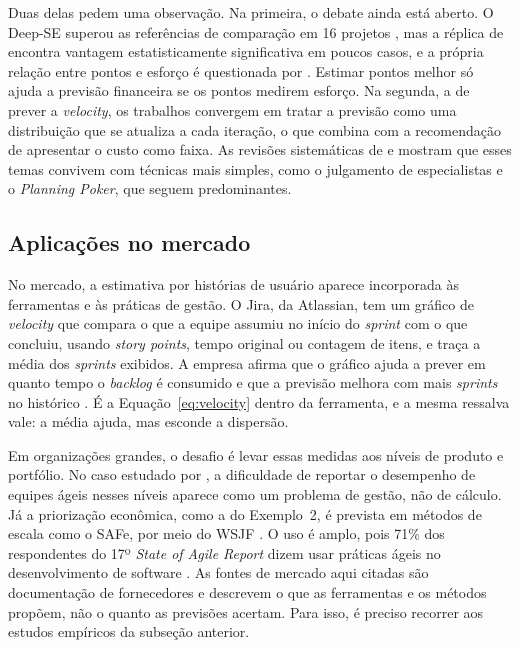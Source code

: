 Duas delas pedem uma observação. Na primeira, o debate ainda está aberto. O
Deep-SE superou as referências de comparação em 16 projetos
\cite{choetkiertikul2019}, mas a réplica de  encontra
vantagem estatisticamente significativa em poucos casos, e a própria relação
entre pontos e esforço é questionada por . Estimar pontos
melhor só ajuda a previsão financeira se os pontos medirem esforço. Na segunda,
a de prever a \textit{velocity}, os trabalhos convergem em tratar a previsão
como uma distribuição que se atualiza a cada iteração, o que combina com a
recomendação de apresentar o custo como faixa. As revisões sistemáticas de
 e  mostram que esses temas
convivem com técnicas mais simples, como o julgamento de especialistas e o
\textit{Planning Poker}, que seguem predominantes.

\subsection{Aplicações no mercado}
\label{sub:aplic-mercado}

No mercado, a estimativa por histórias de usuário aparece incorporada às
ferramentas e às práticas de gestão. O Jira, da Atlassian, tem um gráfico de
\textit{velocity} que compara o que a equipe assumiu no início do
\textit{sprint} com o que concluiu, usando \textit{story points}, tempo original
ou contagem de itens, e traça a média dos \textit{sprints} exibidos. A empresa
afirma que o gráfico ajuda a prever em quanto tempo o \textit{backlog} é
consumido e que a previsão melhora com mais \textit{sprints} no histórico
\cite{atlassianvelocity}. É a Equação~\ref{eq:velocity} dentro da ferramenta, e a
mesma ressalva vale: a média ajuda, mas esconde a dispersão.

Em organizações grandes, o desafio é levar essas medidas aos níveis de produto e
portfólio. No caso estudado por , a dificuldade de
reportar o desempenho de equipes ágeis nesses níveis aparece como um problema de
gestão, não de cálculo. Já a priorização econômica, como a do
Exemplo~2, é prevista em métodos de escala como o SAFe, por meio do WSJF
\cite{safewsjf}. O uso é amplo, pois 71\% dos respondentes do 17º
\textit{State of Agile Report} dizem usar práticas ágeis no desenvolvimento de
software \cite{digitalai2024}. As fontes de mercado aqui citadas são
documentação de fornecedores e descrevem o que as ferramentas e os métodos
propõem, não o quanto as previsões acertam. Para isso, é preciso recorrer aos
estudos empíricos da subseção anterior.
